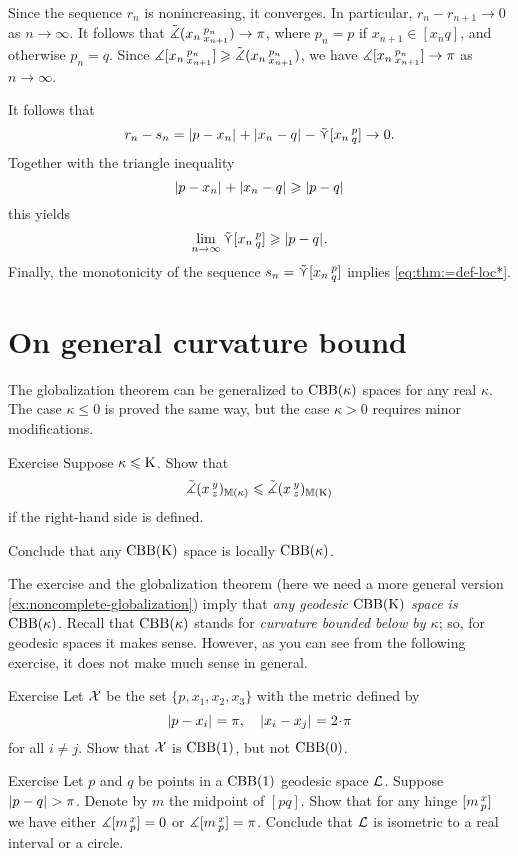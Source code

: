 Since the sequence $r_n$ is nonincreasing, it converges.
In particular, $r_n-r_{n+1}\to 0$ as $n\to\infty$.
It follows that $\tilde\measuredangle(x_n\,{}^{p_n}_{x_{n+1}})\to \pi$,
where $p_n=p$ if $x_{n+1}\in [x_nq]$, and otherwise $p_n=q$.
Since $\measuredangle[x_n\,{}^{p_n}_{x_{n+1}}]\geqslant\tilde\measuredangle(x_n\,{}^{p_n}_{x_{n+1}})$, we have
$\measuredangle[x_n\,{}^{p_n}_{x_{n+1}}]\to \pi$  as $n\to\infty$.

It follows that
\[r_n-s_n=\dist{p}{x_n}{}+\dist{x_n}{q}{}-\side \hinge{x_n}p q\to 0.\] 
Together with the triangle inequality
\[
\dist{p}{x_n}{}+\dist{x_n}{q}{}\ge\dist{p}{q}{}
\]
this yields
\[\lim_{n\to\infty}\side \hinge{x_n}p q\ge \dist{p}{q}{}.\]
Finally, the monotonicity of the sequence $s_n=\mathop{\tilde\curlyvee}\nolimits [x_n\,{}^{p}_{q}]$ implies \ref{eq:thm:=def-loc*}.
\qeds

\section{On general curvature bound}

The globalization theorem  can be generalized to $\mathrm{CBB}(\kappa)$ spaces for any real $\kappa$.
The case $\kappa\le 0$ is proved the same way, but the case $\kappa>0$ requires minor modifications.

\begin{thm}{Exercise}\label{ex:mono-mod-angle}
Suppose $\kappa\leqslant \mathrm{K}$.
Show that 
\[\tilde\measuredangle(x\,{}^{y}_{z})_{\mathbb{M}(\kappa)}\leqslant \tilde\measuredangle(x\,{}^{y}_{z})_{\mathbb{M}(\mathrm{K})}\]
if the right-hand side is defined.

Conclude that any $\mathrm{CBB}(\mathrm{K})$ space is locally $\mathrm{CBB}(\kappa)$.
\end{thm}

The exercise and the globalization theorem (here we need a more general version \ref{ex:noncomplete-globalization}) imply that \textit{any geodesic $\mathrm{CBB}(\mathrm{K})$ space is  $\mathrm{CBB}(\kappa)$}.
Recall that $\mathrm{CBB}(\kappa)$ stands for \textit{curvature bounded below by $\kappa$}; so, for geodesic spaces it makes sense.
However, as you can see from the following exercise, it does not make much sense in general.

\begin{thm}{Exercise}\label{ex:CBB(1)notitCBB(0)}
Let $\mathcal{X}$ be the set $\{p,x_1,x_2,x_3\}$ with the metric defined by
\[\dist{p}{x_i}{}=\pi,\quad\dist{x_i}{x_j}{}=2\cdot\pi\]
for all $i\ne j$.
Show that $\mathcal{X}$ is $\mathrm{CBB}(1)$, but not $\mathrm{CBB}(0)$.
\end{thm}

\begin{thm}{Exercise}\label{ex:RisCBB(1)}
Let $p$ and $q$ be points in a $\mathrm{CBB}(1)$ geodesic space $\mathcal{L}$.
Suppose $\dist{p}{q}{}>\pi$.
Denote by $m$ the midpoint of $[pq]$.
Show that for any hinge $[m\,{}^{x}_{p}]$ we have
either $\measuredangle[m\,{}^{x}_{p}]=0$ or $\measuredangle[m\,{}^{x}_{p}]=\pi$.
Conclude that $\mathcal{L}$ is isometric to a real interval or a circle.

\end{thm}


